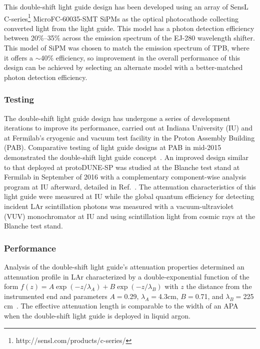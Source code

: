 This double-shift light guide design has been developed using an array of SensL C-series\footnote{http://sensl.com/products/c-series/} MicroFC-60035-SMT SiPMs as the optical photocathode collecting converted light from the light guide. This model has a photon detection efficiency between 20\%--35\% across the emission spectrum of the EJ-280 wavelength shifter. This model of SiPM was chosen to match the emission spectrum of TPB, where it offers a $\sim$40\% efficiency, so improvement in the overall performance of this design can be achieved by selecting an alternate model with a better-matched photon detection efficiency.


\subsubsection{Testing}

The double-shift light guide design has undergone a series of development iterations to improve its performance, carried out at Indiana University (IU) and at Fermilab's cryogenic and vacuum test facility in the Proton Assembly Building (PAB). Comparative testing of light guide designs at PAB in mid-2015 demonstrated the double-shift light guide concept~\cite{bib:JINST-11-C05019}. An improved design similar to that deployed at protoDUNE-SP was studied at the Blanche test stand at Fermilab in September of 2016 with a complementary component-wise analysis program at IU afterward, detailed in Ref.~\cite{bib:DoubleShiftLG-NIM-171113}. The attenuation characteristics of this light guide were measured at IU while the global quantum efficiency for detecting incident LAr scintillation photons was measured with a vacuum-ultraviolet (VUV) monochromator at IU and using scintillation light from cosmic rays at the Blanche test stand.


\subsubsection{Performance}

Analysis of the double-shift light guide's attenuation properties determined an attenuation profile in LAr characterized by a double-exponential function of the form $f(z) = A \exp(-z/\lambda_{A}) + B \exp(-z/\lambda_B)$ with $z$ the distance from the instrumented end and parameters $A = $0.29, $\lambda_A = $4.3cm, $B = $0.71, and $\lambda_B = $225 cm~\cite{bib:DoubleShiftLG-NIM-171113}. The effective attenuation length is comparable to the width of an APA when the double-shift light guide is deployed in liquid argon.

